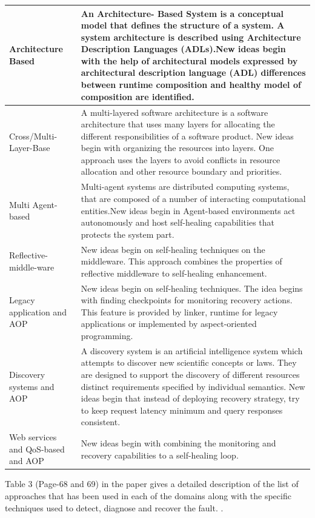 \begin{center}
\begin{tabular}{ | p{3cm} | p{11cm} |}
 \\ \hline
    Architecture Based & An Architecture- Based System is a conceptual model that defines the structure of a system. A system architecture is described using Architecture Description Languages (ADLs).New ideas begin with the help of architectural models expressed by architectural description language (ADL) differences between runtime composition and healthy model of composition are identified. \\
    \hline
    Cross/Multi-Layer-Base & A multi-layered software architecture is a software architecture that uses many layers for allocating the different responsibilities of a software product. New ideas begin with organizing the resources into layers. One approach uses the layers to avoid conflicts in resource allocation and other resource boundary and priorities.  \\ \hline
        Multi Agent-based & Multi-agent systems are distributed computing systems, that are composed of a number of interacting computational entities.New ideas begin in Agent-based environments act autonomously and host self-healing capabilities that protects the system part. 
 \\ \hline
     Reflective-middle-ware & New ideas begin on self-healing techniques on the middleware. This approach combines the properties of reflective middleware to self-healing enhancement.
 \\ \hline
      Legacy application and AOP & New ideas begin on self-healing techniques. The idea begins with finding checkpoints for monitoring recovery actions. This feature is provided by linker, runtime for legacy applications or implemented by aspect-oriented programming.
 \\ \hline
  Discovery systems and AOP & A discovery system is an artificial intelligence system which attempts to discover new scientific concepts or laws.
They are designed to support the discovery of different resources distinct requirements specified by individual semantics. New ideas begin that instead of deploying recovery strategy, try to keep request latency minimum and query responses consistent.
  \\ \hline
   Web services and QoS-based and AOP & New ideas begin with combining the monitoring and recovery capabilities to a self-healing loop. 
    \end{tabular}
\end{center}
Table 3 (Page-68 and 69) in the paper gives a detailed description of the list of approaches that has been used in each of the domains along with the specific techniques used to detect, diagnose and recover the fault.
\cite{Harald:SelfHealingSurvey:2011}.




